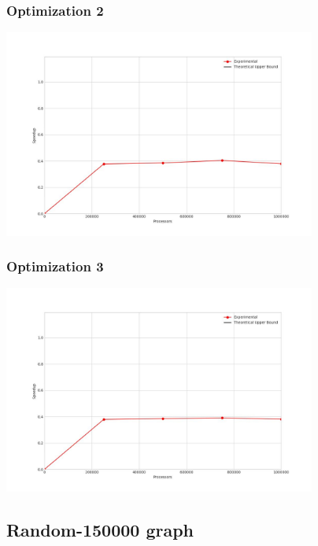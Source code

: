 \subsubsection{Optimization 2}
\begin{center}
    \resizebox{0.8\textwidth}{!}{}
    \includegraphics[width=0.77\textwidth]{../img/speedup-graph_type-fully-disconnected-1000000-O2}
\end{center}

\subsubsection{Optimization 3}
\begin{center}
    \resizebox{0.8\textwidth}{!}{}
    \includegraphics[width=0.77\textwidth]{../img/speedup-graph_type-fully-disconnected-1000000-O3}
\end{center}

\clearpage
\subsection{Random-150000 graph}

